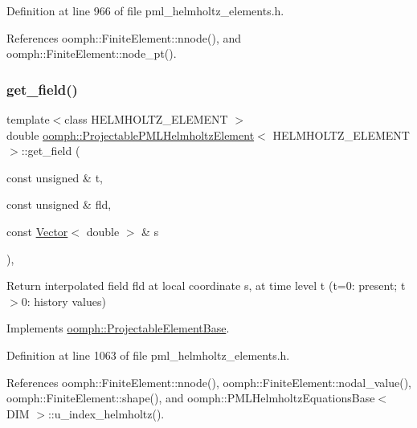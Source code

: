 Definition at line 966 of file pml\+\_\+helmholtz\+\_\+elements.\+h.



References oomph\+::\+Finite\+Element\+::nnode(), and oomph\+::\+Finite\+Element\+::node\+\_\+pt().

\mbox{\label{classoomph_1_1ProjectablePMLHelmholtzElement_a14a5a245ec1fa36c371a3937a3fb4e96}} 
\subsubsection{\texorpdfstring{get\+\_\+field()}{get\_field()}}
{\footnotesize\ttfamily template$<$class H\+E\+L\+M\+H\+O\+L\+T\+Z\+\_\+\+E\+L\+E\+M\+E\+NT $>$ \\
double \hyperlink{classoomph_1_1ProjectablePMLHelmholtzElement}{oomph\+::\+Projectable\+P\+M\+L\+Helmholtz\+Element}$<$ H\+E\+L\+M\+H\+O\+L\+T\+Z\+\_\+\+E\+L\+E\+M\+E\+NT $>$\+::get\+\_\+field (\begin{DoxyParamCaption}\item[{const unsigned \&}]{t,  }\item[{const unsigned \&}]{fld,  }\item[{const \hyperlink{classoomph_1_1Vector}{Vector}$<$ double $>$ \&}]{s }\end{DoxyParamCaption})\hspace{0.3cm}{\ttfamily [inline]}, {\ttfamily [virtual]}}



Return interpolated field fld at local coordinate s, at time level t (t=0\+: present; t$>$0\+: history values) 



Implements \hyperlink{classoomph_1_1ProjectableElementBase_ae4da5b565b6d333be2f5920f7be763cd}{oomph\+::\+Projectable\+Element\+Base}.



Definition at line 1063 of file pml\+\_\+helmholtz\+\_\+elements.\+h.



References oomph\+::\+Finite\+Element\+::nnode(), oomph\+::\+Finite\+Element\+::nodal\+\_\+value(), oomph\+::\+Finite\+Element\+::shape(), and oomph\+::\+P\+M\+L\+Helmholtz\+Equations\+Base$<$ D\+I\+M $>$\+::u\+\_\+index\+\_\+helmholtz().

